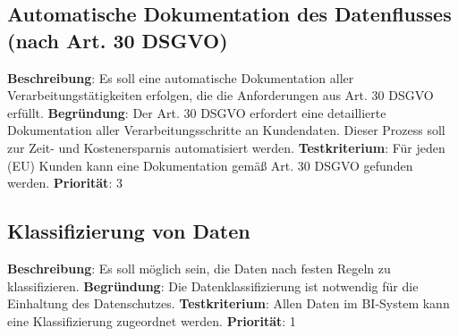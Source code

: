 \subsection{Automatische Dokumentation des Datenflusses (nach Art. 30 DSGVO)} \label{sec:anforderungsspezifikation:datenflussDokumentation}
\textbf{Beschreibung}: Es soll eine automatische Dokumentation aller Verarbeitungstätigkeiten erfolgen, die die Anforderungen aus Art. 30 DSGVO erfüllt.
\newline \textbf{Begründung}: Der Art. 30 DSGVO erfordert eine detaillierte Dokumentation aller Verarbeitungsschritte an Kundendaten. Dieser Prozess soll zur Zeit- und Kostenersparnis automatisiert werden.
\newline \textbf{Testkriterium}: Für jeden (EU) Kunden kann eine Dokumentation gemäß Art. 30 DSGVO gefunden werden.
\newline \textbf{Priorität}: 3

\subsection{Klassifizierung von Daten} \label{sec:anforderungsspezifikation:DatenKlassifizierung}
\textbf{Beschreibung}: Es soll möglich sein, die Daten nach festen Regeln zu klassifizieren. 
\newline \textbf{Begründung}: Die Datenklassifizierung ist notwendig für die Einhaltung des Datenschutzes.
\newline \textbf{Testkriterium}: Allen Daten im BI-System kann eine Klassifizierung zugeordnet werden.
\newline \textbf{Priorität}: 1